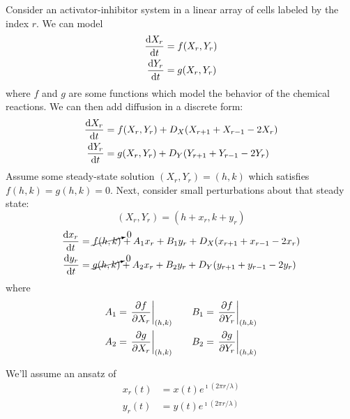 \documentclass[a4paper,twoside,master.tex]{subfiles}
\begin{document}
Consider an activator-inhibitor system in a linear array of cells labeled by the index $ r $. We can model
\begin{align}
    \dv{X_r}{t} &= f(X_r, Y_r) \\
    \dv{Y_r}{t} &= g(X_r, Y_r)
\end{align}
where $ f $ and $ g $ are some functions which model the behavior of the chemical reactions. We can then add diffusion in a discrete form:
\begin{align}
    \dv{X_r}{t} &= f(X_r, Y_r) + D_X(X_{r+1} + X_{r-1} - 2 X_r) \\
    \dv{Y_r}{t} &= g(X_r, Y_r) + D_Y(Y_{r+1} + Y_{r-1} - 2 Y_r) \\
\end{align}
Assume some steady-state solution $ (X_r, Y_r)= (h,k) $ which satisfies $ f(h,k)=g(h,k) = 0 $. Next, consider small perturbations about that steady state:
\begin{equation}
    (X_r, Y_r) = (h + x_r, k + y_r)
\end{equation}
\begin{align}
    \dv{x_r}{t} &= \cancelto{0}{f(h,k)} + A_1 x_r + B_1 y_r + D_X (x_{r+1} + x_{r-1} - 2 x_r)\\
    \dv{y_r}{t} &= \cancelto{0}{g(h,k)} + A_2 x_r + B_2 y_r + D_Y (y_{r+1} + y_{r-1} - 2 y_r)
\end{align}
where
\begin{align}
    A_1 = \eval{\pdv{f}{X_r}}_{(h,k)} &\qquad B_1 = \eval{\pdv{f}{Y_r}}_{(h,k)} \\
    A_2 = \eval{\pdv{g}{X_r}}_{(h,k)} &\qquad B_2 = \eval{\pdv{g}{Y_r}}_{(h,k)}
\end{align}

We'll assume an ansatz of
\begin{align}
    x_r(t) &= x(t) e^{\imath (2 \pi r/\lambda)} \\
    y_r(t) &= y(t) e^{\imath (2 \pi r/\lambda)} \\
\end{align}
\end{document}
